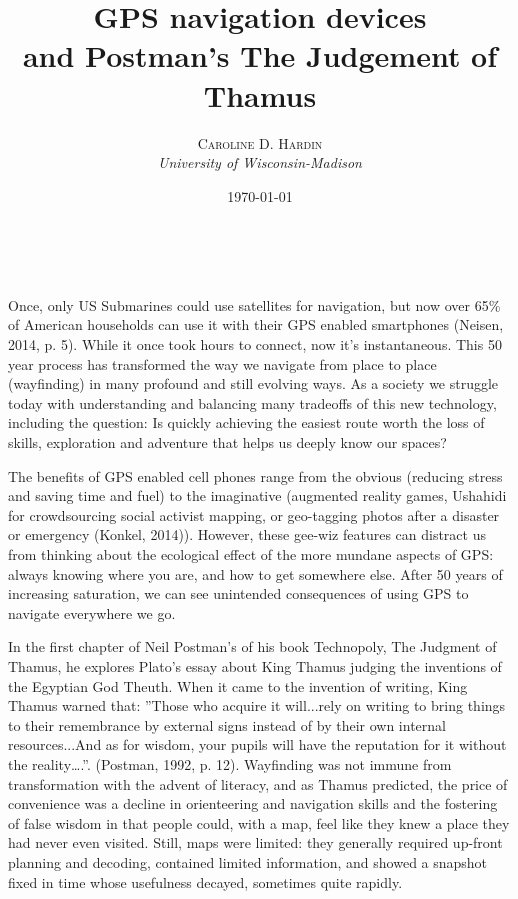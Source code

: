 \documentclass[a4paper]{article}
\title{\textbf{GPS navigation devices }\\ %
and Postman’s The Judgement of Thamus } %
\author{\textsc{Caroline D. Hardin} %
\\{\textit{University of Wisconsin-Madison}}} %
\date{\today} %
\makeatletter
\renewcommand{\maketitle}{ 
\begin{flushright} %
{\LARGE\@title} %
\vspace{50pt} %
{\large\@author} %
\\\@date %
\vspace{40pt} %
\end{flushright}
}
\makeatother
\begin{document}
\maketitle %

\cite[para.~15]{Capps2014}

Once, only US Submarines could use satellites for navigation, but now over 65\% of American households can use it with their GPS enabled smartphones (Neisen, 2014, p. 5). While it once took hours to connect, now it’s instantaneous. This 50 year process has transformed the way we navigate from place to place (wayfinding) in many profound and still evolving ways. As a society we struggle today with understanding and balancing many tradeoffs of this new technology, including the question: Is quickly achieving the easiest route worth the loss of skills, exploration and adventure that helps us deeply know our spaces?
	
The benefits of GPS enabled cell phones range from the obvious (reducing stress and saving time and fuel) to the imaginative (augmented reality games, Ushahidi for crowdsourcing social activist mapping, or geo-tagging photos after a disaster or emergency (Konkel, 2014)). However, these gee-wiz features can distract us from thinking about the ecological effect of the more mundane aspects of GPS: always knowing where you are, and how to get somewhere else. After 50 years of increasing saturation, we can see unintended consequences of using GPS to navigate everywhere we go.

In the first chapter of Neil Postman’s of his book Technopoly, The Judgment of Thamus, he explores Plato’s essay about King Thamus judging the inventions of the Egyptian God Theuth. When it came to the invention of writing, King Thamus warned that: ”Those who acquire it will...rely on writing to bring things to their remembrance by external signs instead of by their own internal resources...And as for wisdom, your pupils will have the reputation for it without the reality….”. (Postman, 1992, p. 12). Wayfinding was not immune from transformation with the advent of literacy, and as Thamus predicted, the price of convenience was a decline in orienteering and navigation skills and the fostering of false wisdom in that people could, with a map, feel like they knew a place they had never even visited. Still, maps were limited: they generally required up-front planning and decoding, contained limited information, and showed a snapshot fixed in time whose usefulness decayed, sometimes quite rapidly. 
\end{document}
